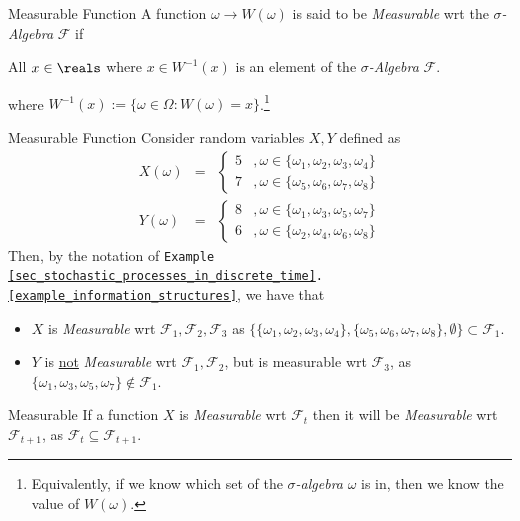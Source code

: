 \documentclass[11pt,a4paper]{article}
\begin{document}
  \begin{definition}{Measurable Function}
    A function $\omega\to W(\omega)$ is said to be \textit{Measurable} wrt the \textit{$\sigma$-Algebra} $\mathcal{F}$ if
    \begin{center}
      All $x\in\reals$ where $x\in W^{-1}(x)$ is an element of the \textit{$\sigma$-Algebra} $\mathcal{F}$.
    \end{center}
    where $W^{-1}(x):=\big\{\omega\in\Omega:W(\omega)=x\big\}$.\footnote{Equivalently, if we know which set of the \textit{$\sigma$-algebra} $\omega$ is in, then we know the value of $W(\omega)$.}
  \end{definition}

  \begin{example}{Measurable Function}
    Consider random variables $X,Y$ defined as
    \[\begin{array}{rcl}
      X(\omega)&=&\begin{cases}
        5&,\omega\in\{\omega_1,\omega_2,\omega_3,\omega_4\}\\
        7&,\omega\in\{\omega_5,\omega_6,\omega_7,\omega_8\}
      \end{cases}\\
      Y(\omega)&=&\begin{cases}
        8&,\omega\in\{\omega_1,\omega_3,\omega_5,\omega_7\}\\
        6&,\omega\in\{\omega_2,\omega_4,\omega_6,\omega_8\}
      \end{cases}
    \end{array}\]
    Then, by the notation of \texttt{Example \ref{sec_stochastic_processes_in_discrete_time}.\ref{example_information_structures}}, we have that
    \begin{itemize}
      \item $X$ is \textit{Measurable} wrt $\mathcal{F}_1,\mathcal{F}_2,\mathcal{F}_3$ as $\big\{\{\omega_1,\omega_2,\omega_3,\omega_4\},\{\omega_5,\omega_6,\omega_7,\omega_8\},\emptyset\big\}\subset\mathcal{F}_1$.
      \item $Y$ is \underline{not} \textit{Measurable} wrt $\mathcal{F}_1,\mathcal{F}_2$, but is measurable wrt $\mathcal{F}_3$, as $\{\omega_1,\omega_3,\omega_5,\omega_7\}\not\in\mathcal{F}_1$.
    \end{itemize}
  \end{example}

  \begin{remark}{Measurable}
    If a function $X$ is \textit{Measurable} wrt $\mathcal{F}_t$ then it will be \textit{Measurable} wrt $\mathcal{F}_{t+1}$, as $\mathcal{F}_t\subseteq\mathcal{F}_{t+1}$.
  \end{remark}
\end{document}
